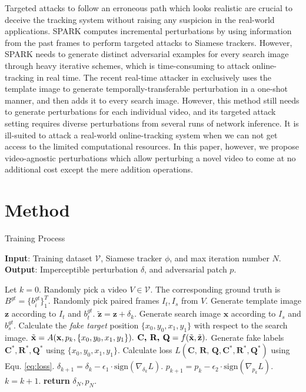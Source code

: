 \documentclass[journal]{IEEEtran}
\begin{document}
Targeted attacks to follow an erroneous path which looks realistic are crucial to deceive the tracking system without raising any suspicion in the real-world applications.
SPARK \cite{SPARK} computes incremental perturbations by using information from the past frames to perform targeted attacks to Siamese trackers. However, SPARK needs to generate distinct adversarial examples for every search image through heavy iterative schemes, which is time-consuming to attack online-tracking in real time. The recent real-time attacker in \cite{TTP} exclusively uses the template image to generate temporally-transferable perturbation in a one-shot manner, and then adds it to every search image. However, this method still needs to generate perturbations for each individual video, and its targeted attack setting requires diverse perturbations from several runs of network inference. It is ill-suited to attack a real-world online-tracking system when we can not get access to the limited computational resources. In this paper, however, we propose video-agnostic perturbations which allow perturbing a novel video to come at no additional cost except the mere addition operations.

\section{Method}

\begin{algorithm}[tb]
  \caption{Training Process}
  \label{alg:algorithm}
  \textbf{Input}: Training dataset $\mathcal{V}$, Siamese tracker $\phi$, and max iteration number $N$.\\
  \textbf{Output}: Imperceptible perturbation $\delta$, and adversarial patch $p$.
  \begin{algorithmic}[1] %
  \STATE Let $k = 0$.
  \STATE Randomly pick a video $V\in \mathcal{V}$. The corresponding ground truth is $B^{gt}=\{b^{gt}_i\}^T_1$.
  \STATE Randomly pick paired frames $I_t, I_s$ from $V$.
  \STATE Generate template image $\textbf{z}$ according to $I_t$ and $b^{gt}_t$.
  \STATE $\tilde{\textbf{z}} = \textbf{z} + \delta_k.$
  \STATE Generate search image $\textbf{x}$ according to $I_s$ and $b^{gt}_s$.
  \STATE Calculate the \textit{fake target} position $\{x_0, y_0, x_1, y_1\}$ with respect to the search image.
  \STATE $\tilde{\textbf x} = A(\textbf x, p_k, \{x_0, y_0, x_1, y_1\}).$
  \STATE $\textbf{C, R, Q} = f(\tilde {\textbf x}, \tilde{\textbf z}).$
  \STATE Generate fake labels $\textbf{C}^*,\textbf{R}^*,\textbf{Q}^*$ using $\{x_0, y_0, x_1, y_1\}$.
  \STATE Calculate loss $L(\textbf{C, R, Q}, \textbf{C}^*, \textbf{R}^*, \textbf{Q}^*)$ using Equ. \ref{eq:loss}.
  \STATE $\delta_{k+1} = \delta_{k} - \epsilon_1 \cdot \text{sign}(\nabla_{\delta_k}L).$
  \STATE $p_{k+1} = p_{k} - \epsilon_2 \cdot \text{sign}(\nabla_{p_k}L).$
  \STATE $k = k + 1.$
  \ENDWHILE
  \STATE \textbf{return} $\delta_N, p_N.$
  \end{algorithmic}
  \label{alg}
\end{algorithm}
\end{document}
